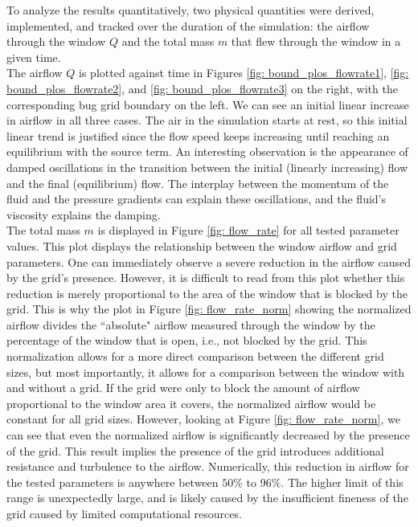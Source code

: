 To analyze the results quantitatively, two physical quantities were derived, implemented, and tracked over the duration of the simulation: the airflow through the window $Q$ and the total mass $m$ that flew through the window in a given time. \\
The airflow $Q$ is plotted against time in Figures \ref{fig: bound_plos_flowrate1}, \ref{fig: bound_plos_flowrate2}, and \ref{fig: bound_plos_flowrate3} on the right, with the corresponding bug grid boundary on the left. We can see an initial linear increase in airflow in all three cases. The air in the simulation starts at rest, so this initial linear trend is justified since the flow speed keeps increasing until reaching an equilibrium with the source term. An interesting observation is the appearance of damped oscillations in the transition between the initial (linearly increasing) flow and the final (equilibrium) flow. The interplay between the momentum of the fluid and the pressure gradients can explain these oscillations, and the fluid's viscosity explains the damping. \\
The total mass $m$ is displayed in Figure \ref{fig: flow_rate} for all tested parameter values.
This plot displays the relationship between the window airflow and grid parameters. One can immediately observe a severe reduction in the airflow caused by the grid's presence. However, it is difficult to read from this plot whether this reduction is merely proportional to the area of the window that is blocked by the grid. 
This is why the plot in Figure \ref{fig: flow_rate_norm} showing the normalized airflow divides the ``absolute" airflow measured through the window by the percentage of the window that is open, i.e., not blocked by the grid. This normalization allows for a more direct comparison between the different grid sizes, but most importantly, it allows for a comparison between the window with and without a grid. If the grid were only to block the amount of airflow proportional to the window area it covers, the normalized airflow would be constant for all grid sizes. However, looking at Figure \ref{fig: flow_rate_norm}, we can see that even the normalized airflow is significantly decreased by the presence of the grid. This result implies the presence of the grid introduces additional resistance and turbulence to the airflow. Numerically, this reduction in airflow for the tested parameters is anywhere between $50\%$ to $96\%$. The higher limit of this range is unexpectedly large, and is likely caused by the insufficient fineness of the grid caused by limited computational resources. \\ 
\\


